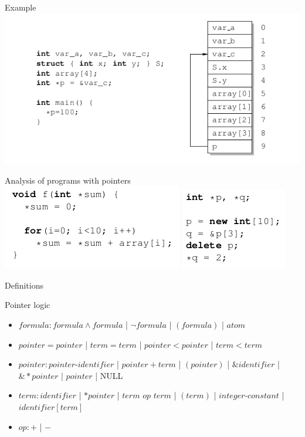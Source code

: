 \documentclass{beamer}
\begin{document}
\begin{frame}{Example}
\includegraphics[scale=0.5]{layout.png}
\end{frame}

\begin{frame}{Analysis of programs with pointers}
\includegraphics[scale=0.5]{ex1.png}
\includegraphics[scale=0.5]{ex2.png}
\end{frame}

\begin{frame}{Definitions}
\begin{block}{Pointer logic}
\begin{itemize}
\item $formula: formula \wedge formula$ | $\lnot formula$ | $(formula)$ | $atom$
\item $pointer = pointer$ | $term = term$ | $pointer < pointer$ | $term < term$
\item $pointer : pointer$-$identifier$ | $pointer + term$ | $(pointer)$ | $\&identifier$ | $\&*pointer$ | $pointer$ | NULL
\item $term : identifier$ | $*pointer$ | $term$ $op$ $term$ | $(term)$ | $integer$-$constant$ | $identifier[term]$
\item $op : +$ | $-$
\end{itemize}
\end{block}
\end{frame}
\end{document}
